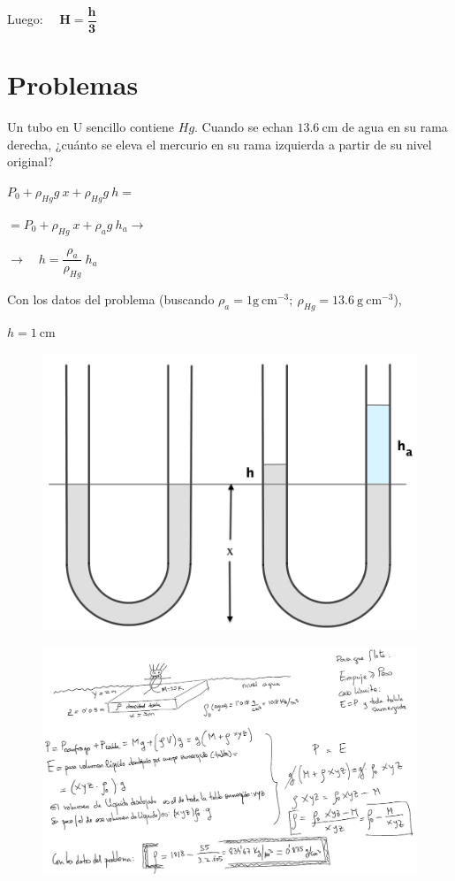 Luego: $\quad \boldsymbol{H=\dfrac h 3}$


\section{Problemas}

\begin{prob}
Un tubo en U sencillo contiene $Hg$. Cuando se echan $13.6\ \mathrm{cm}$ de agua en su rama derecha, ¿cuánto se eleva el mercurio en su rama izquierda a partir de su nivel original?	
\end{prob}
\begin{multicols}{2}
$P_0+\rho_{Hg}g \ x+\rho_{Hg}g\ h=$

$=P_0 + \rho_{Hg} \ x + \rho_a g \ h_a \to$

$\to \quad h=\dfrac {\rho_a}{\rho_{Hg}}\ h_a $

Con los datos del problema (buscando $\rho_a=1 \mathrm{g}\ \mathrm{cm}^{-3}; \ \rho_{Hg}=13.6 \ \mathrm{g\ cm}^{-3}$),

$h=1\ \mathrm{cm}$
\begin{figure}[H]
	\centering
	\includegraphics[width=.35\textwidth]{imagenes/imagenes07/T07IM19.png}
\end{figure}	
\end{multicols}

\vspace{30mm} %
\begin{prob}	
\end{prob}
\begin{figure}[H]
	\centering
	\includegraphics[width=1\textwidth]{imagenes/imagenes07/T07IM18.png}
\end{figure}



